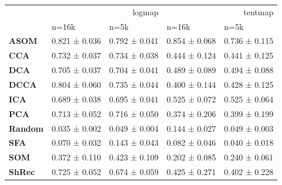 \begin{tabular}{lllll}
\toprule
 & \multicolumn{2}{r}{logmap} & \multicolumn{2}{r}{tentmap} \\
 & n=16k & n=5k & n=16k & n=5k \\
\midrule
\textbf{ASOM} & 0.821 ± 0.036 & 0.792 ± 0.041 & 0.854 ± 0.068 & 0.736 ± 0.115 \\
\textbf{CCA} & 0.732 ± 0.037 & 0.734 ± 0.038 & 0.444 ± 0.124 & 0.441 ± 0.125 \\
\textbf{DCA} & 0.705 ± 0.037 & 0.704 ± 0.041 & 0.489 ± 0.089 & 0.494 ± 0.088 \\
\textbf{DCCA} & 0.804 ± 0.060 & 0.735 ± 0.044 & 0.400 ± 0.144 & 0.428 ± 0.125 \\
\textbf{ICA} & 0.689 ± 0.038 & 0.695 ± 0.041 & 0.525 ± 0.072 & 0.525 ± 0.064 \\
\textbf{PCA} & 0.713 ± 0.052 & 0.716 ± 0.050 & 0.374 ± 0.206 & 0.399 ± 0.199 \\
\textbf{Random} & 0.035 ± 0.002 & 0.049 ± 0.004 & 0.144 ± 0.027 & 0.049 ± 0.003 \\
\textbf{SFA} & 0.070 ± 0.032 & 0.143 ± 0.043 & 0.082 ± 0.046 & 0.040 ± 0.018 \\
\textbf{SOM} & 0.372 ± 0.110 & 0.423 ± 0.109 & 0.202 ± 0.085 & 0.240 ± 0.061 \\
\textbf{ShRec} & 0.725 ± 0.052 & 0.674 ± 0.059 & 0.425 ± 0.271 & 0.402 ± 0.228 \\
\bottomrule
\end{tabular}
